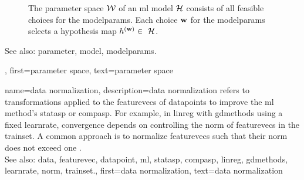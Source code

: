 {{\begin{figure}[H]
\begin{center}
			\end{center} 
			\caption{The \gls{parameter} space $\mathcal{W}$ of an \gls{ml} \gls{model} $\mathcal{H}$ consists of all 
			feasible choices for the \gls{modelparams}. Each choice ${\bf w}$ for the \gls{modelparams} 
			selects a \gls{hypothesis} \gls{map} $\hypothesis^{(\weights)} \in \hypospace$.
				 \label{fig_param_space_dict}} 
			\end{figure}
			See also: \gls{parameter}, \gls{model}, \gls{modelparams}.},
		first={parameter space},
		text={parameter space}
}

{name={data normalization},
	description={\Gls{data} normalization refers to transformations 
		applied to the \glspl{featurevec} of \glspl{datapoint} to improve the \gls{ml} method's 
		\gls{statasp} or \gls{compasp}. For example, in \gls{linreg} with \gls{gdmethods} using 
		a fixed \gls{learnrate}, convergence depends on controlling the \gls{norm} of \glspl{featurevec} 
		in the \gls{trainset}. A common approach is to normalize \glspl{featurevec} such that their 
		\gls{norm} does not exceed one \cite[Ch.\ 5]{MLBasics}.
				\\
		See also: \gls{data}, \gls{featurevec}, \gls{datapoint}, \gls{ml}, \gls{statasp}, \gls{compasp}, \gls{linreg}, \gls{gdmethods}, \gls{learnrate}, \gls{norm}, \gls{trainset}.},
	first={data normalization},
	text={data normalization}
}

